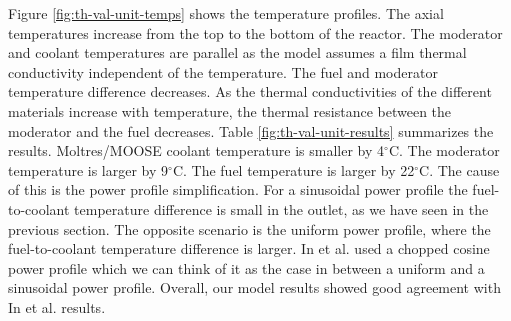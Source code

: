 \begin{figure}[htbp!]
	\centering
	\hfill
	\label{fig:th-val-unit-model}
\end{figure}

Figure \ref{fig:th-val-unit-temps} shows the temperature profiles.
The axial temperatures increase from the top to the bottom of the reactor.
The moderator and coolant temperatures are parallel as the model assumes a film thermal conductivity independent of the temperature.
The fuel and moderator temperature difference decreases.
As the thermal conductivities of the different materials increase with temperature, the thermal resistance between the moderator and the fuel decreases.
Table \ref{fig:th-val-unit-results} summarizes the results.
Moltres/MOOSE coolant temperature is smaller by 4$^{\circ}$C.
The moderator temperature is larger by 9$^{\circ}$C.
The fuel temperature is larger by 22$^{\circ}$C.
The cause of this is the power profile simplification.
For a sinusoidal power profile the fuel-to-coolant temperature difference is small in the outlet, as we have seen in the previous section.
The opposite scenario is the uniform power profile, where the fuel-to-coolant temperature difference is larger.
In et al. used a chopped cosine power profile which we can think of it as the case in between a uniform and a sinusoidal power profile.
Overall, our model results showed good agreement with In et al. results.

